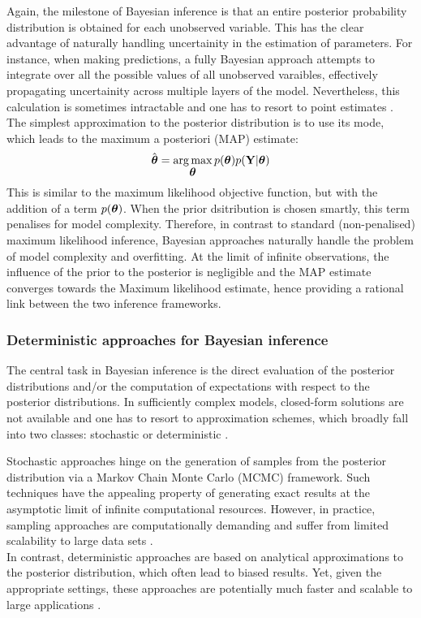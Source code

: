 Again, the milestone of Bayesian inference is that an entire posterior probability distribution is obtained for each unobserved variable. This has the clear advantage of naturally handling uncertainity in the estimation of parameters. For instance, when making predictions, a fully Bayesian approach attempts to integrate over all the possible values of all unobserved varaibles, effectively propagating uncertainity across multiple layers of the model. Nevertheless, this calculation is sometimes intractable and one has to resort to point estimates \cite{Bishop2006,Murphy,Gelman2013}. The simplest approximation to the posterior distribution is to use its mode, which leads to the maximum a posteriori (MAP) estimate:
\[
	\hat{\mbox{\boldmath $\theta$}} = \operatorname*{arg\,max}_{\mbox{\boldmath $\theta$}} p(\mbox{\boldmath $\theta$}) p({\bf Y}|\mbox{\boldmath $\theta$}) 
\]
This is similar to the maximum likelihood objective function, but with the addition of a term $p(\mbox{\boldmath $\theta$})$. When the prior dsitribution is chosen smartly, this term penalises for model complexity. Therefore, in contrast to standard (non-penalised) maximum likelihood inference, Bayesian approaches naturally handle the problem of model complexity and overfitting\cite{Bishop2006,Murphy,Gelman2013}. At the limit of infinite observations, the influence of the prior to the posterior is negligible and the MAP estimate converges towards the Maximum likelihood estimate, hence providing a rational link between the two inference frameworks.

\subsubsection{Deterministic approaches for Bayesian inference} \label{section:deterministic_bayesian_inference}
The central task in Bayesian inference is the direct evaluation of the posterior distributions and/or the computation of expectations with respect to the posterior distributions. In sufficiently complex models, closed-form solutions are not available and one has to resort to approximation schemes, which broadly fall into two classes: stochastic or deterministic \cite{Gelman2013,Blei2016}. 

Stochastic approaches hinge on the generation of samples from the posterior distribution via a Markov Chain Monte Carlo (MCMC) framework. Such techniques have the appealing property of generating exact results at the asymptotic limit of infinite computational resources. However, in practice, sampling approaches are computationally demanding and suffer from limited scalability to large data sets \cite{Blei2016}. \\
In contrast, deterministic approaches are based on analytical approximations to the posterior distribution, which often lead to biased results. Yet, given the appropriate settings, these approaches are potentially much faster and scalable to large applications \cite{Bishop2006,Murphy,Blei2016}.

